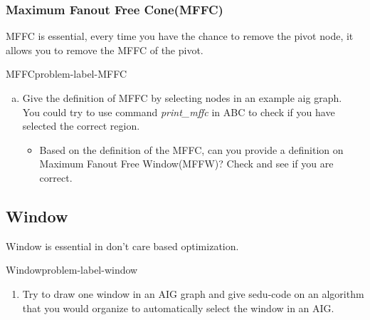 \documentclass[main.tex]{subfiles}
\begin{document}
\subsubsection{Maximum Fanout Free Cone(MFFC)}
MFFC is essential, every time you have the chance to remove the pivot node, it allows you to remove the MFFC of the pivot.
\begin{problem}{MFFC}{problem-label-MFFC}
\begin{enumerate}[(a)]
   \item Give the definition of MFFC by selecting nodes in an example aig graph.\\
   You could try to use command \textit{print\_mffc} in ABC to check if you have selected the correct region.
   \begin{itemize}
       \item Based on the definition of the MFFC, can you provide a definition on Maximum Fanout Free Window(MFFW)? Check \cite{ZhuFFW} and see if you are correct.
   \end{itemize}
\end{enumerate}
\end{problem}
\vspace*{4\baselineskip}

\subsection{Window}
Window is essential in don't care based optimization.
\begin{problem}{Window}{problem-label-window}
\begin{enumerate}[{a}]
    \item Try to draw one window in an AIG graph and give sedu-code on an algorithm that you would organize to automatically select the window in an AIG.
\end{enumerate}
\end{problem}
\vspace*{4\baselineskip}
\end{document}
